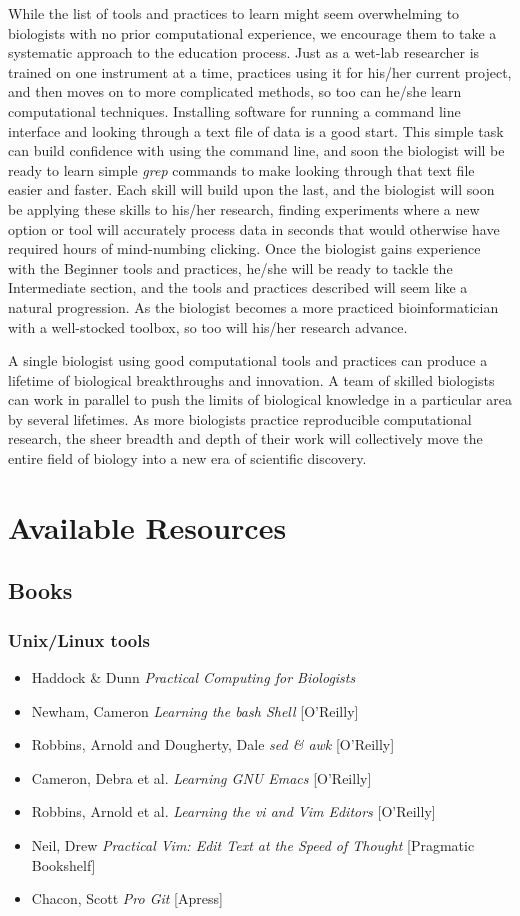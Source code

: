 \documentclass[ChapterTOCs,krantz2]{krantz} %
\begin{document}
While the list of tools and practices to learn might seem overwhelming to
biologists with no prior computational experience, we encourage them to take a
systematic approach to the education process.  Just as a wet-lab researcher is
trained on one instrument at a time, practices using it for
his/her current project, and then moves on to more complicated methods, so too
can he/she learn computational techniques.  Installing software for
running a command line interface and looking through a text file of data is a
good start.  This simple task can build confidence with using the command line,
and soon the biologist will be ready to learn simple \emph{grep} commands to make
looking through that text file easier and faster.  Each skill will build upon
the last, and the biologist will soon be applying these skills to his/her
research, finding experiments where a new option or tool will
accurately process data in seconds that would otherwise have required hours of
mind-numbing clicking.  Once the biologist gains experience with the Beginner
tools and practices, he/she will be ready to tackle the Intermediate section,
and the tools and practices described will seem like a natural progression.  As
the biologist becomes a more practiced bioinformatician with a well-stocked
toolbox, so too will his/her research advance.  

A single biologist using good computational tools and
practices can produce a lifetime of biological breakthroughs and innovation.  A
team of skilled biologists can work in parallel to push the
limits of biological knowledge in a particular area by several lifetimes.  As
more biologists practice reproducible computational research, the sheer breadth
and depth of their work will collectively move the entire field of biology into
a new era of scientific discovery.

\section{Available Resources}
\subsection{Books}
\subsubsection{Unix/Linux tools}
\begin{itemize}
\item Haddock \& Dunn \emph{Practical Computing for Biologists}
\item Newham, Cameron \emph{Learning the bash Shell} [O'Reilly]
\item Robbins, Arnold and Dougherty, Dale \emph{sed \& awk} [O'Reilly]
\item Cameron, Debra et al. \emph{Learning GNU Emacs} [O'Reilly]
\item Robbins, Arnold et al. \emph{Learning the vi and Vim Editors} [O'Reilly]
\item Neil, Drew \emph{Practical Vim: Edit Text at the Speed of Thought} [Pragmatic Bookshelf]
\item Chacon, Scott \emph{Pro Git} [Apress]
\end{itemize}
\end{document}
